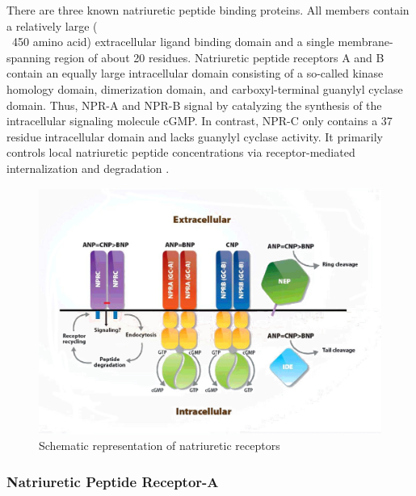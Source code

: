 \documentclass[14pt,a4paper,onecolumn]{extarticle}
\begin{document}
There are three known natriuretic peptide binding proteins. All members contain a relatively large (\\~450 amino acid) extracellular ligand binding domain and a single membrane-spanning region of about 20 residues. Natriuretic peptide receptors A and B contain an equally large intracellular domain consisting of a so-called kinase homology domain, dimerization domain, and carboxyl-terminal guanylyl cyclase domain. Thus, NPR-A and NPR-B signal by catalyzing the synthesis of the intracellular signaling molecule cGMP. In contrast, NPR-C only contains a 37 residue intracellular domain and lacks guanylyl cyclase activity. It primarily controls local natriuretic peptide concentrations via receptor-mediated internalization and degradation \citep{Rose2008}. %



\begin{figure}

    \centering

    \includegraphics[scale=1]{../../images/NP_receptors.jpg}

    \small\caption{Schematic representation of natriuretic receptors}

    \label{NP_receptors}

\end{figure}





\subsubsection{Natriuretic Peptide Receptor-A}
\end{document}

